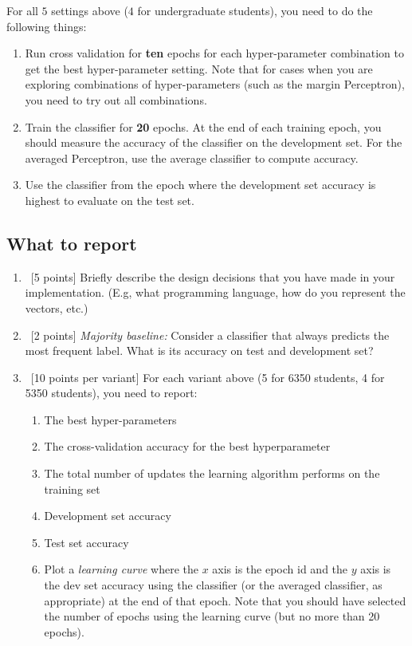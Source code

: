 For all $5$ settings above ($4$ for undergraduate students), you need to do the following things:

\begin{enumerate}
\item Run cross validation for {\bf ten} epochs for each
  hyper-parameter combination to get the best hyper-parameter
  setting. Note that for cases when you are exploring combinations of
  hyper-parameters (such as the margin Perceptron), you need to try
  out all combinations.

\item Train the classifier for {\bf 20} epochs. At the end of each
  training epoch, you should measure the accuracy of the classifier on
  the development set. For the averaged Perceptron, use the average
  classifier to compute accuracy.

\item Use the classifier from the epoch where the development set
  accuracy is highest to evaluate on the test set.
\end{enumerate}

\subsection{What to report}

\begin{enumerate}
\item~[5 points] Briefly describe the design decisions that you have
  made in your implementation. (E.g, what programming language, how do
  you represent the vectors, etc.)
\item~[2 points] {\em Majority baseline:} Consider a classifier that
  always predicts the most frequent label. What is its accuracy on
  test and development set?
\item~[10 points per variant] For each variant above (5 for 6350 students, 4 for 5350 students), you need to report:
  \begin{enumerate}
  \item The best hyper-parameters
  \item The cross-validation accuracy for the best hyperparameter 
	  \item The total number of updates the learning algorithm performs on the training set
  \item Development set accuracy
  \item Test set accuracy
	  \item Plot a {\em learning curve} where the $x$ axis is the epoch id
	    and the $y$ axis is the dev set accuracy using the classifier (or
	    the averaged classifier, as appropriate) at the end of that
	    epoch. Note that you should have selected the number of epochs
	    using the learning curve (but no more than 20 epochs).
  \end{enumerate}
\end{enumerate}

